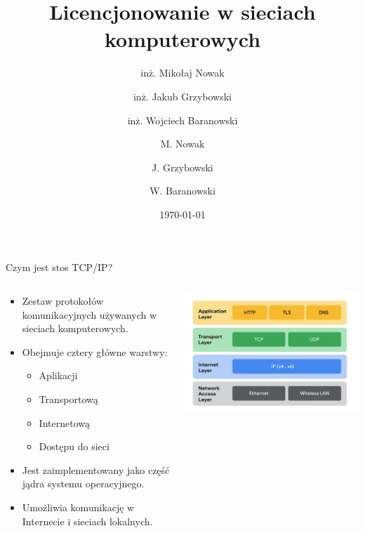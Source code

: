 \documentclass[aspectratio=169]{beamer}
\title[PG Presentation]{Licencjonowanie w sieciach komputerowych}
\author{inż. Mikołaj Nowak \and inż. Jakub Grzybowski \and inż. Wojciech Baranowski}
\date{\today}
\begin{document}
\pgtitleframe


\author{M. Nowak \and J. Grzybowski \and W. Baranowski}

\begin{frame}{Czym jest stos TCP/IP?}
  \begin{columns}
    \begin{column}{0.55\textwidth}
      \begin{itemize}
        \item Zestaw protokołów komunikacyjnych używanych w sieciach komputerowych.
        \item Obejmuje cztery główne warstwy:
        \begin{itemize}
          \item Aplikacji
          \item Transportową
          \item Internetową
          \item Dostępu do sieci
        \end{itemize}
        \item Jest zaimplementowany jako część jądra systemu operacyjnego.
        \item Umożliwia komunikację w Internecie i sieciach lokalnych.
      \end{itemize}
    \end{column}
    \begin{column}{0.4\textwidth}
      \centering
      \includegraphics[width=\linewidth]{tcpip.png}
    \end{column}
  \end{columns}
\end{frame}
\end{document}
